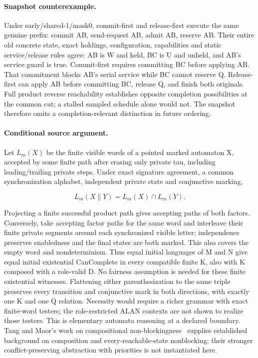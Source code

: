 \documentclass[11pt,a4paper]{article}
\theoremstyle{definition}
\theoremstyle{remark}
\begin{document}
\paragraph{Snapshot counterexample.} Under early/shared-1/mask0, commit-first and release-first execute the same genuine prefix: commit AB, send-request AB, admit AB, reserve AB. Their entire old concrete state, exact holdings, configuration, capabilities and static service/release rules agree: AB is W and held, BC is U and unheld, and AB's service guard is true. Commit-first requires committing BC before applying AB. That commitment blocks AB's serial service while BC cannot reserve Q. Release-first can apply AB before committing BC, release Q, and finish both originals. Full product reverse reachability establishes opposite completion possibilities at the common cut; a stalled sampled schedule alone would not. The snapshot therefore omits a completion-relevant distinction in future ordering.

\paragraph{Conditional source argument.} Let $L_m(X)$ be the finite visible words of a pointed marked automaton X, accepted by some finite path after erasing only private tau, including leading/trailing private steps. Under exact signature agreement, a common synchronization alphabet, independent private state and conjunctive marking,

\[L_m(X \parallel Y)=L_m(X)\cap L_m(Y).\]

Projecting a finite successful product path gives accepting paths of both factors. Conversely, take accepting factor paths for the same word and interleave their finite private segments around each synchronized visible letter; independence preserves enabledness and the final states are both marked. This also covers the empty word and nondeterminism. Thus equal initial languages of M and N give equal initial existential CanComplete in every compatible finite K, also with K composed with a role-valid D. No fairness assumption is needed for these finite existential witnesses. Flattening either parenthesization to the same triple preserves every transition and conjunctive mark in both directions, with exactly one K and one Q relation. Necessity would require a richer grammar with exact finite-word testers; the role-restricted ALAN contexts are not shown to realize those testers. This is elementary automata reasoning at a declared boundary. Tang and Moor's work on compositional non-blockingness~\cite{tang2024compositional} supplies established background on composition and every-reachable-state nonblocking; their stronger conflict-preserving abstraction with priorities is not instantiated here.
\end{document}
